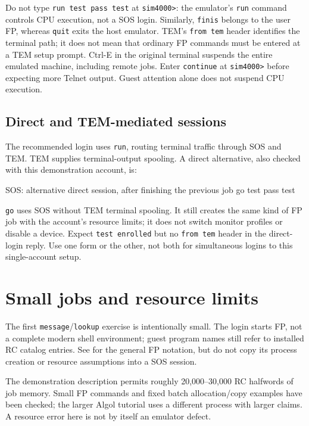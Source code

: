 Do not type \texttt{run test pass test} at \texttt{sim4000>}: the emulator's
\texttt{run} command controls CPU execution, not a SOS login. Similarly,
\texttt{finis} belongs to the user FP, whereas \texttt{quit} exits the host
emulator. TEM's \texttt{from tem} header identifies the terminal path; it
does not mean that ordinary FP commands must be entered at a TEM setup prompt.
Ctrl-E in the original terminal suspends the entire emulated machine,
including remote jobs. Enter \texttt{continue} at \texttt{sim4000>} before
expecting more Telnet output. Guest attention alone does not suspend CPU
execution.

\subsection{Direct and TEM-mediated sessions}\label{mips-ts-go-and-run}

The recommended login uses \texttt{run}, routing terminal traffic through
SOS and TEM. TEM supplies terminal-output spooling. A direct alternative,
also checked with this demonstration account, is:

\begin{commandexample}{SOS: alternative direct session, after finishing the previous job}
go test pass test
\end{commandexample}

\texttt{go} uses SOS without TEM terminal spooling. It still creates the
same kind of FP job with the account's resource limits; it does not switch
monitor profiles or disable a device. Expect \texttt{test enrolled} but no
\texttt{from tem} header in the direct-login reply. Use one form or the
other, not both for simultaneous logins to this single-account setup.

\section{Small jobs and resource limits}\label{mips-ts-small-jobs}

The first \texttt{message}/\texttt{lookup} exercise is intentionally small.
The login starts FP, not a complete modern shell environment; guest program
names still refer to installed RC catalog entries. See
 for the general FP notation, but do not copy its process
creation or resource assumptions into a SOS session.

The demonstration description permits roughly 20,000--30,000 RC halfwords
of job memory. Small FP commands and fixed batch allocation/copy examples
have been checked; the larger Algol tutorial uses a different process with
larger claims. A resource error here is not by itself an emulator defect.

